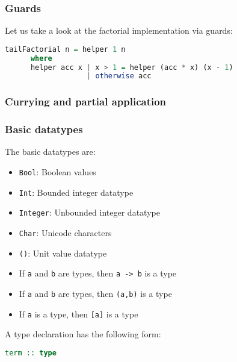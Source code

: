 \documentclass[10pt,pdf,utf8,russian,aspectratio=169]{beamer}
\begin{document}
\begin{frame}[fragile]
  \frametitle{Guards}

  Let us take a look at the factorial implementation via guards:

  \begin{lstlisting}[language=Haskell]
    tailFactorial n = helper 1 n
      where
      helper acc x | x > 1 = helper (acc * x) (x - 1)
                   | otherwise acc
  \end{lstlisting}
\end{frame}

\begin{frame}
  \frametitle{Currying and partial application}
\end{frame}

\begin{frame}[fragile]
  \frametitle{Basic datatypes}
  The basic datatypes are:
  \begin{itemize}
    \item \verb"Bool": Boolean values
    \item \verb"Int": Bounded integer datatype
    \item \verb"Integer": Unbounded integer datatype
    \item \verb"Char": Unicode characters
    \item \verb"()": Unit value datatype
    \item If \verb"a" and \verb"b" are types, then \verb"a -> b" is a type
    \item If \verb"a" and \verb"b" are types, then \verb"(a,b)" is a type
    \item If \verb"a" is a type, then \verb"[a]" is a type
  \end{itemize}

  A type declaration has the following form:

  \begin{lstlisting}[language=Haskell]
    term :: type
  \end{lstlisting}
\end{frame}
\end{document}
